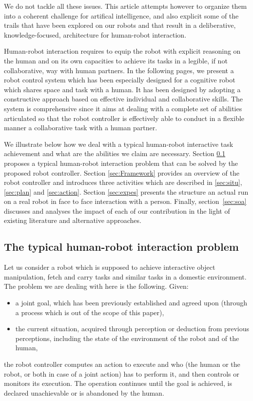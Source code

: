 \documentclass[preprint,12pt]{elsarticle}
\begin{document}
We do not tackle all these issues. This article attempts however to organize
them into a coherent challenge for artifical intelligence, and also explicit
some of the trails that have been explored on our robots and that result in a
deliberative, knowledge-focused, architecture for human-robot interaction.

Human-robot interaction requires to equip the robot with explicit reasoning on
the human and on its own capacities to achieve its tasks in a legible, if not
collaborative, way with human partners. In the following pages, we present a
robot control system which has been especially designed for a cognitive robot
which shares space and task with a human. It has been designed by adopting a
constructive approach based on effective individual and collaborative skills.
The system is comprehensive since it aims at dealing with a complete set of
abilities articulated so that the robot controller is effectively able to
conduct in a flexible manner a collaborative task with a human partner.

We illustrate below how we deal with a typical human-robot interactive task
achievement and what are the abilities we claim are necessary. Section
\ref{sec:problem} proposes a typical human-robot interaction problem that can
be solved by the proposed robot controller. Section
\ref{sec:Framework} provides an overview of the robot controller and
introduces three activities which are described in \ref{sec:situ},
\ref{sec:plan} and \ref{sec:action}. Section \ref{sec:expes}
presents the structure an actual run on a real robot in face to face interaction with a
person. Finally, section~\ref{sec:soa} discusses and analyses the impact of
each of our contribution in the light of existing literature and alternative
approaches.

\subsection{The typical human-robot interaction problem}\label{sec:problem}

Let us consider a robot which is supposed to achieve interactive
object manipulation, fetch and carry tasks and similar tasks in a
domestic environment. The problem we are dealing with here is the
following. Given:
\begin {itemize}
\item a joint goal, which has been previously established and agreed
  upon (through a process which is out of the scope of this paper),
\item the current situation, acquired through perception or
  deduction from previous perceptions, including the state of the
  environment of the robot and of the human,
\end {itemize}
the robot controller computes an action to execute and who (the 
human or the robot, or both in case of a joint action) has to perform
it, and then controls or monitors its execution. The operation
continues until the goal is achieved, is declared unachievable or is
abandoned by the human.
\end{document}
